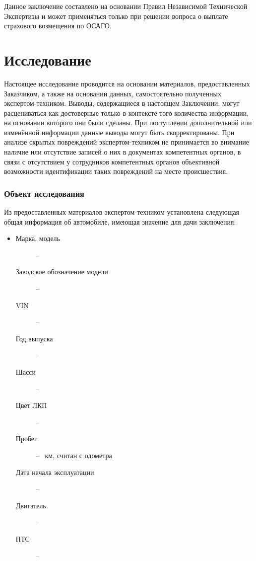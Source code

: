 Данное заключение составлено на основании Правил Независимой Технической Экспертизы и может применяться только при решении вопроса о выплате страхового возмещения по ОСАГО.


\section{Исследование}

Настоящее исследование проводится на основании материалов, предоставленных Заказчиком, а также на основании данных, самостоятельно полученных экспертом-техником. Выводы, содержащиеся в настоящем Заключении, могут расцениваться как достоверные только в контексте того количества информации, на основании которого они были сделаны. При поступлении дополнительной или изменённой информации данные выводы могут быть
скорректированы. При анализе скрытых повреждений экспертом-техником не принимается во внимание наличие или отсутствие записей о них в документах компетентных органов, в связи с отсутствием у сотрудников компетентных органов объективной возможности  идентификации таких повреждений на месте происшествия.

\subsubsection{Объект исследования}

	\par Из предоставленных материалов   экспертом-техником установлена следующая общая информация об автомобиле, имеющая значение для дачи заключения:
 \parbox[]{10cm}{}
\begin{itemize}
	\item[ ] 
	\begin{description}
		\item[Марка, модель] -- 
        	\item[Заводское обозначение модели] --  
		\item[VIN] -- \vin
		\item[Год выпуска] -- 
		\item[Шасси] -- 
		\item[Цвет ЛКП] -- 
		\item[Пробег] --  \, км, считан с одометра
		\item[Дата начала эксплуатации] -- 
		\item[Двигатель] -- 
		\item[ПТС] --
	\end{description}
\end{itemize}

